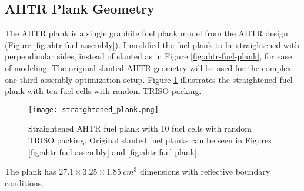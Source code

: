 \subsection{AHTR Plank Geometry}
\label{sec:ahtr-plank-geometry}
The \gls{AHTR} plank is a single graphite fuel plank model from the \gls{AHTR} design (Figure 
\ref{fig:ahtr-fuel-assembly}). 
I modified the fuel plank to be straightened with perpendicular sides, instead 
of slanted as in Figure \ref{fig:ahtr-fuel-plank}, for ease of modeling. 
The original slanted \gls{AHTR} geometry will be used for the complex one-third assembly 
optimization setup. 
Figure \ref{fig:straightened_plank} illustrates the straightened fuel plank with 
ten fuel cells with random \gls{TRISO} packing.
\begin{figure}[htbp]
    \centering
    \texttt{[image: straightened\_plank.png]}
    \raggedright
    \caption{Straightened \acrfull{AHTR} fuel plank with 10 fuel cells with random 
    TRISO packing. Original slanted fuel planks can be seen in Figures 
    \ref{fig:ahtr-fuel-assembly} and \ref{fig:ahtr-fuel-plank}.}
    \label{fig:straightened_plank}
\end{figure}
The plank has $27.1 \times 3.25 \times 1.85\ cm^3$ dimensions with reflective 
boundary conditions.

